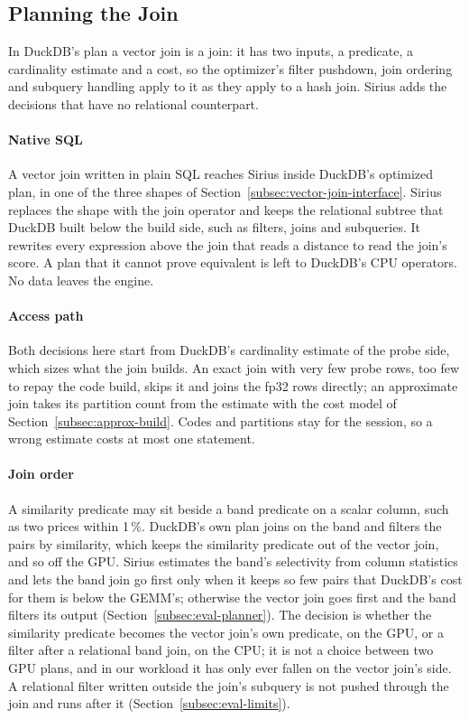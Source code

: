 \subsection{Planning the Join}\label{subsec:integration-plan}

In DuckDB's plan a vector join is a join: it has two inputs, a predicate, a cardinality estimate and a cost, so the optimizer's filter pushdown, join ordering and subquery handling apply to it as they apply to a hash join.
Sirius adds the decisions that have no relational counterpart.

\paragraph{Native SQL}
A vector join written in plain SQL reaches Sirius inside DuckDB's optimized plan, in one of the three shapes of Section~\ref{subsec:vector-join-interface}.
Sirius replaces the shape with the join operator and keeps the relational subtree that DuckDB built below the build side, such as filters, joins and subqueries.
It rewrites every expression above the join that reads a distance to read the join's score.
A plan that it cannot prove equivalent is left to DuckDB's CPU operators.
No data leaves the engine.

\paragraph{Access path}
Both decisions here start from DuckDB's cardinality estimate of the probe side, which sizes what the join builds.
An exact join with very few probe rows, too few to repay the code build, skips it and joins the fp32 rows directly; an approximate join takes its partition count from the estimate with the cost model of Section~\ref{subsec:approx-build}.
Codes and partitions stay for the session, so a wrong estimate costs at most one statement.


\paragraph{Join order}
A similarity predicate may sit beside a band predicate on a scalar column, such as two prices within 1\,\%.
DuckDB's own plan joins on the band and filters the pairs by similarity, which keeps the similarity predicate out of the vector join, and so off the GPU.
Sirius estimates the band's selectivity from column statistics and lets the band join go first only when it keeps so few pairs that DuckDB's cost for them is below the GEMM's; otherwise the vector join goes first and the band filters its output (Section~\ref{subsec:eval-planner}).
The decision is whether the similarity predicate becomes the vector join's own predicate, on the GPU, or a filter after a relational band join, on the CPU; it is not a choice between two GPU plans, and in our workload it has only ever fallen on the vector join's side.
A relational filter written outside the join's subquery is not pushed through the join and runs after it (Section~\ref{subsec:eval-limits}).

